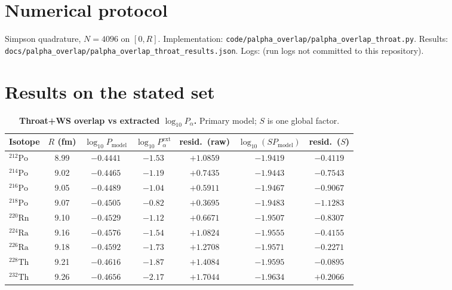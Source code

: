 \documentclass[11pt,a4paper]{article}
\theoremstyle{remark}
\begin{document}
\section{Numerical protocol}

Simpson quadrature, $N=4096$ on $[0,R]$.  Implementation:
\nolinkurl{code/palpha_overlap/palpha_overlap_throat.py}.
Results:
\nolinkurl{docs/palpha_overlap/palpha_overlap_throat_results.json}.
Logs:
(run logs not committed to this repository).

\section{Results on the stated set}

\begin{table}[H]
\centering
\caption{\textbf{Throat+WS overlap vs extracted $\log_{10} P_\alpha$.}
Primary model; $S$ is one global factor.}
\label{tab:throat-overlap}
\vspace{0.2em}
\scriptsize
\renewcommand{\arraystretch}{0.75}
\setlength{\tabcolsep}{5pt}
\begin{adjustbox}{max width=\linewidth}\begin{tabular}{lcccccc}
\toprule
\textbf{Isotope} & \textbf{$R$ (fm)} & \textbf{$\log_{10} P_{\mathrm{model}}$}
 & \textbf{$\log_{10} P_\alpha^{\mathrm{ext}}$}
 & \textbf{resid.\ (raw)}
 & \textbf{$\log_{10}(S P_{\mathrm{model}})$}
 & \textbf{resid.\ ($S$)} \\
\midrule
$^{212}\mathrm{Po}$ & 8.99 & $-0.4441$ & $-1.53$ & $+1.0859$ & $-1.9419$ & $-0.4119$ \\
$^{214}\mathrm{Po}$ & 9.02 & $-0.4465$ & $-1.19$ & $+0.7435$ & $-1.9443$ & $-0.7543$ \\
$^{216}\mathrm{Po}$ & 9.05 & $-0.4489$ & $-1.04$ & $+0.5911$ & $-1.9467$ & $-0.9067$ \\
$^{218}\mathrm{Po}$ & 9.07 & $-0.4505$ & $-0.82$ & $+0.3695$ & $-1.9483$ & $-1.1283$ \\
$^{220}\mathrm{Rn}$ & 9.10 & $-0.4529$ & $-1.12$ & $+0.6671$ & $-1.9507$ & $-0.8307$ \\
$^{224}\mathrm{Ra}$ & 9.16 & $-0.4576$ & $-1.54$ & $+1.0824$ & $-1.9555$ & $-0.4155$ \\
$^{226}\mathrm{Ra}$ & 9.18 & $-0.4592$ & $-1.73$ & $+1.2708$ & $-1.9571$ & $-0.2271$ \\
$^{228}\mathrm{Th}$ & 9.21 & $-0.4616$ & $-1.87$ & $+1.4084$ & $-1.9595$ & $-0.0895$ \\
$^{232}\mathrm{Th}$ & 9.26 & $-0.4656$ & $-2.17$ & $+1.7044$ & $-1.9634$ & $+0.2066$ \\

\end{tabular}
\end{adjustbox}
\end{table}
\end{document}

